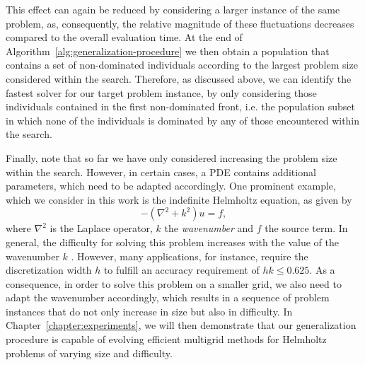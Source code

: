 This effect can again be reduced by considering a larger instance of the same problem, as, consequently, the relative magnitude of these fluctuations decreases compared to the overall evaluation time.
At the end of Algorithm~\ref{alg:generalization-procedure} we then obtain a population that contains a set of non-dominated individuals according to the largest problem size considered within the search.
Therefore, as discussed above, we can identify the fastest solver for our target problem instance, by only considering those individuals contained in the first non-dominated front, i.e. the population subset in which none of the individuals is dominated by any of those encountered within the search.

Finally, note that so far we have only considered increasing the problem size within the search.
However, in certain cases, a PDE contains additional parameters, which need to be adapted accordingly.
One prominent example, which we consider in this work is the indefinite Helmholtz equation, as given by
\begin{equation}
	-(\nabla^{2} + k^{2})u = f,
	\label{eq:helmholtz}
\end{equation}
where $\nabla^{2}$ is the Laplace operator, $k$ the \emph{wavenumber} and $f$ the source term.
In general, the difficulty for solving this problem increases with the value of the wavenumber $k$ .
However, many applications, for instance, require the discretization width $h$ to fulfill an accuracy requirement of $h k \leq 0.625$. 
As a consequence, in order to solve this problem on a smaller grid, we also need to adapt the wavenumber accordingly, which results in a sequence of problem instances that do not only increase in size but also in difficulty.
In Chapter~\ref{chapter:experiments}, we will then demonstrate that our generalization procedure is capable of evolving efficient multigrid methods for Helmholtz problems of varying size and difficulty.

